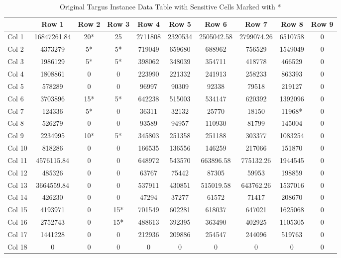 \documentclass[11pt,a4paper]{article}
\begin{document}
\begin{table}[H]
    \centering
    \begin{tabular}{l | c c c c c c c c c}
         & Row 1 & Row 2 & Row 3 & Row 4 & Row 5 & Row 6 & Row 7 & Row 8 & Row 9\\
        \toprule
        Col 1 & 16847261.84 & 20* & 25 & 2711808 & 2320534 & 2505042.58 & 2799074.26 & 6510758 & 0 \\
        Col 2 & 4373279     & 5* & 5* & 719049 & 659680 & 688962 & 756529 & 1549049 & 0 \\
        Col 3 & 1986129     & 5* & 5* & 398062 & 348039 & 354711 & 418778 & 466529 & 0 \\
        Col 4 & 1808861     & 0 & 0 & 223990 & 221332 & 241913 & 258233 & 863393 & 0 \\
        Col 5 & 578289      & 0 & 0 & 96997 & 90309 & 92338 & 79518 & 219127 & 0 \\
        Col 6 & 3703896     & 15* & 5* & 642238 & 515003 & 534147 & 620392 & 1392096 & 0 \\
        Col 7 & 124336      & 5* & 0 & 36311 & 32132 & 25770 & 18150 & 11968* & 0 \\
        Col 8 & 526279      & 0 & 0 & 93589 & 94957 & 110930 & 81799 & 145004 & 0 \\
        Col 9 & 2234995     & 10* & 5* & 345803 & 251358 & 251188 & 303377 & 1083254 & 0 \\
        Col 10 & 818286     & 0 & 0 & 166535 & 136556 & 146259 & 217066 & 151870 & 0 \\
        Col 11 & 4576115.84 & 0 & 0 & 648972 & 543570 & 663896.58 & 775132.26 & 1944545 & 0 \\
        Col 12 & 485326     & 0 & 0 & 63767 & 75442 & 87305 & 59953 & 198859 & 0 \\
        Col 13 & 3664559.84 & 0 & 0 & 537911 & 430851 & 515019.58 & 643762.26 & 1537016 & 0 \\
        Col 14 & 426230     & 0 & 0 & 47294 & 37277 & 61572 & 71417 & 208670 & 0 \\
        Col 15 & 4193971    & 0 & 15* & 701549 & 602281 & 618037 & 647021 & 1625068 & 0 \\
        Col 16 & 2752743    & 0 & 15* & 488613 & 392395 & 363490 & 402925 & 1105305 & 0 \\
        Col 17 & 1441228    & 0 & 0 & 212936 & 209886 & 254547 & 244096 & 519763 & 0 \\
        Col 18 & 0          & 0 & 0 & 0 & 0 & 0 & 0 & 0 & 0 \\
      \end{tabular}
    \caption{Original Targus Instance Data Table with Sensitive Cells Marked with *}
    \label{tab:targus-original}
\end{table}
\end{document}
